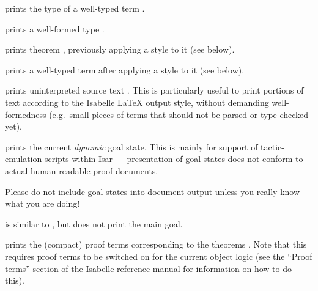 \begin{isabellebody}
\begin{isamarkuptext}
\begin{descr}
  \item [\isa{{\isachardoublequote}{\isacharat}{\isacharbraceleft}typeof\ t{\isacharbraceright}{\isachardoublequote}}] prints the type of a well-typed term
  .

  \item [\isa{{\isachardoublequote}{\isacharat}{\isacharbraceleft}typ\ {\isasymtau}{\isacharbraceright}{\isachardoublequote}}] prints a well-formed type \isa{{\isachardoublequote}{\isasymtau}{\isachardoublequote}}.
  
  \item [\isa{{\isachardoublequote}{\isacharat}{\isacharbraceleft}thm{\isacharunderscore}style\ s\ a{\isacharbraceright}{\isachardoublequote}}] prints theorem ,
  previously applying a style  to it (see below).
  
  \item [\isa{{\isachardoublequote}{\isacharat}{\isacharbraceleft}term{\isacharunderscore}style\ s\ t{\isacharbraceright}{\isachardoublequote}}] prints a well-typed term  after applying a style  to it (see below).

  \item [\isa{{\isachardoublequote}{\isacharat}{\isacharbraceleft}text\ s{\isacharbraceright}{\isachardoublequote}}] prints uninterpreted source text .  This is particularly useful to print portions of text according
  to the Isabelle {\LaTeX} output style, without demanding
  well-formedness (e.g.\ small pieces of terms that should not be
  parsed or type-checked yet).

  \item [\isa{{\isachardoublequote}{\isacharat}{\isacharbraceleft}goals{\isacharbraceright}{\isachardoublequote}}] prints the current \emph{dynamic} goal
  state.  This is mainly for support of tactic-emulation scripts
  within Isar --- presentation of goal states does not conform to
  actual human-readable proof documents.

  Please do not include goal states into document output unless you
  really know what you are doing!
  
  \item [\isa{{\isachardoublequote}{\isacharat}{\isacharbraceleft}subgoals{\isacharbraceright}{\isachardoublequote}}] is similar to , but
  does not print the main goal.
  
  \item [\isa{{\isachardoublequote}{\isacharat}{\isacharbraceleft}prf\ a\isactrlsub {\isadigit{1}}\ {\isasymdots}\ a\isactrlsub n{\isacharbraceright}{\isachardoublequote}}] prints the (compact)
  proof terms corresponding to the theorems . Note that this requires proof terms to be switched on
  for the current object logic (see the ``Proof terms'' section of the
  Isabelle reference manual for information on how to do this).
  

\end{descr}
\end{isamarkuptext}
\end{isabellebody}
